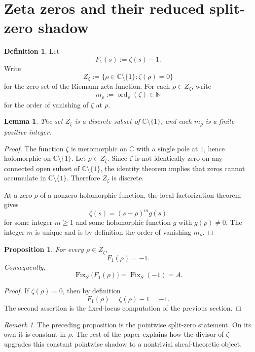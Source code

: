 \documentclass[11pt,a4paper]{article}
\newtheorem{proposition}[theorem]{Proposition}
\newtheorem{lemma}[theorem]{Lemma}
\theoremstyle{definition}
\newtheorem{definition}[theorem]{Definition}
\theoremstyle{remark}
\newtheorem{remark}[theorem]{Remark}
\DeclareMathOperator{\Fix}{Fix}
\DeclareMathOperator{\ord}{ord}
\newcommand{\CC}{\mathbb C}
\newcommand{\NN}{\mathbb N}
\begin{document}
\section{Zeta zeros and their reduced split-zero shadow}

\begin{definition}
Let
\[
F_1(s):=\zeta(s)-1.
\]
Write
\[
Z_\zeta:=\{\rho\in\CC\setminus\{1\}:\zeta(\rho)=0\}
\]
for the zero set of the Riemann zeta function. For each \(\rho\in Z_\zeta\), write
\[
m_\rho:=\ord_\rho(\zeta)\in\NN
\]
for the order of vanishing of \(\zeta\) at \(\rho\).
\end{definition}

\begin{lemma}
The set \(Z_\zeta\) is a discrete subset of \(\CC\setminus\{1\}\), and each \(m_\rho\) is a finite positive integer.
\end{lemma}

\begin{proof}
The function \(\zeta\) is meromorphic on \(\CC\) with a single pole at \(1\), hence holomorphic on \(\CC\setminus\{1\}\). Let \(\rho\in Z_\zeta\). Since \(\zeta\) is not identically zero on any connected open subset of \(\CC\setminus\{1\}\), the identity theorem implies that zeros cannot accumulate in \(\CC\setminus\{1\}\). Therefore \(Z_\zeta\) is discrete.

At a zero \(\rho\) of a nonzero holomorphic function, the local factorization theorem gives
\[
\zeta(s)=(s-\rho)^m g(s)
\]
for some integer \(m\ge1\) and some holomorphic function \(g\) with \(g(\rho)\ne0\). The integer \(m\) is unique and is by definition the order of vanishing \(m_\rho\).
\end{proof}

\begin{proposition}
For every \(\rho\in Z_\zeta\),
\[
F_1(\rho)=-1.
\]
Consequently,
\[
\Fix_S\bigl(F_1(\rho)\bigr)=\Fix_S(-1)=A.
\]
\end{proposition}

\begin{proof}
If \(\zeta(\rho)=0\), then by definition
\[
F_1(\rho)=\zeta(\rho)-1=-1.
\]
The second assertion is the fixed-locus computation of the previous section.
\end{proof}

\begin{remark}
The preceding proposition is the pointwise split-zero statement. On its own it is constant in \(\rho\). The rest of the paper explains how the divisor of \(\zeta\) upgrades this constant pointwise shadow to a nontrivial sheaf-theoretic object.
\end{remark}
\end{document}
